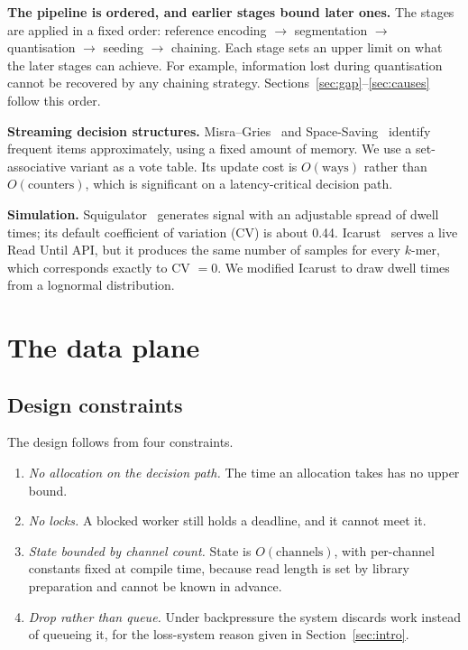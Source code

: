 \documentclass[runningheads]{llncs}
\begin{document}
\textbf{The pipeline is ordered, and earlier stages bound later ones.} The stages are applied in
a fixed order: reference encoding $\rightarrow$ segmentation $\rightarrow$ quantisation
$\rightarrow$ seeding $\rightarrow$ chaining. Each stage sets an upper limit on what the later
stages can achieve. For example, information lost during quantisation cannot be recovered by any
chaining strategy. Sections~\ref{sec:gap}--\ref{sec:causes} follow this order.

\textbf{Streaming decision structures.} Misra--Gries~\cite{misragries} and
Space-Saving~\cite{spacesaving} identify frequent items approximately, using a fixed amount of
memory. We use a set-associative variant as a vote table. Its update cost is $O(\text{ways})$ rather than
$O(\text{counters})$, which is significant on a latency-critical decision path.

\textbf{Simulation.} Squigulator~\cite{squigulator} generates signal with an adjustable spread
of dwell times; its default coefficient of variation (CV) is about 0.44. Icarust~\cite{icarust}
serves a live Read Until API, but it produces the same number of samples for every $k$-mer,
which corresponds exactly to CV $= 0$. We modified Icarust to draw dwell times from a lognormal
distribution.

\section{The data plane}
\label{sec:plane}

\subsection{Design constraints}

The design follows from four constraints.
\begin{enumerate}
\item \emph{No allocation on the decision path.} The time an allocation takes has no upper
bound.
\item \emph{No locks.} A blocked worker still holds a deadline, and it cannot meet it.
\item \emph{State bounded by channel count.} State is $O(\text{channels})$, with per-channel
constants fixed at compile time, because read length is set by library preparation and cannot
be known in advance.
\item \emph{Drop rather than queue.} Under backpressure the system discards work instead of
queueing it, for the loss-system reason given in Section~\ref{sec:intro}.
\end{enumerate}
\end{document}
